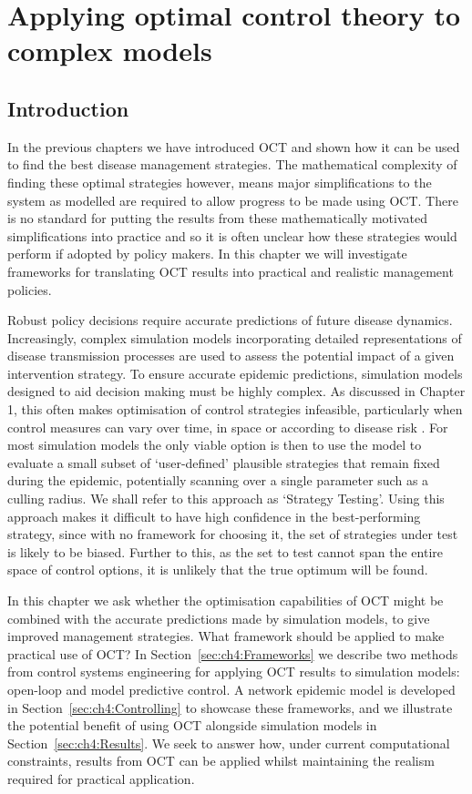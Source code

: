 %
\chapter{Applying optimal control theory to complex models}
\label{ch:apply_to_complex}

\section{Introduction}
\label{sec:ch4:Intro}

In the previous chapters we have introduced OCT and shown how it can be used to find the best disease management strategies. The mathematical complexity of finding these optimal strategies however, means major simplifications to the system as modelled are required to allow progress to be made using OCT. There is no standard for putting the results from these mathematically motivated simplifications into practice and so it is often unclear how these strategies would perform if adopted by policy makers. In this chapter we will investigate frameworks for translating OCT results into practical and realistic management policies.

Robust policy decisions require accurate predictions of future disease dynamics. Increasingly, complex simulation models incorporating detailed representations of disease transmission processes are used to assess the potential impact of a given intervention strategy. To ensure accurate epidemic predictions, simulation models designed to aid decision making must be highly complex. As discussed in Chapter 1, this often makes optimisation of control strategies infeasible, particularly when control measures can vary over time, in space or according to disease risk \citep{bellman_dynamic_2013}. For most simulation models the only viable option is then to use the model to evaluate a small subset of `user-defined' plausible strategies that remain fixed during the epidemic, potentially scanning over a single parameter such as a culling radius. We shall refer to this approach as `Strategy Testing'. Using this approach makes it difficult to have high confidence in the best-performing strategy, since with no framework for choosing it, the set of strategies under test is likely to be biased. Further to this, as the set to test cannot span the entire space of control options, it is unlikely that the true optimum will be found.

In this chapter we ask whether the optimisation capabilities of OCT might be combined with the accurate predictions made by simulation models, to give improved management strategies. What framework should be applied to make practical use of OCT? In Section~\ref{sec:ch4:Frameworks} we describe two methods from control systems engineering for applying OCT results to simulation models: open-loop and model predictive control. A network epidemic model is developed in Section~\ref{sec:ch4:Controlling} to showcase these frameworks, and we illustrate the potential benefit of using OCT alongside simulation models in Section~\ref{sec:ch4:Results}. We seek to answer how, under current computational constraints, results from OCT can be applied whilst maintaining the realism required for practical application.


